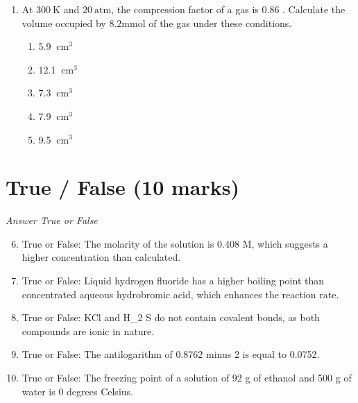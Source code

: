 \documentclass[12pt]{article}
\begin{document}
\begin{enumerate}[label=\arabic*.]
\begin{enumerate}[label=(\alph*)]
    \item IR radiation can ionize organic molecules, providing structural information
    \item absorption of IR radiation increases with molecular complexity
    \item all molecular bonds absorb IR radiation
    \item IR spectroscopy can identify isotopes within organic molecules
    \item most organic functional groups absorb in a characteristic region of the IR spectrum
\end{enumerate}
\item At $300 \mathrm{~K}$ and $20 \mathrm{~atm}$, the compression factor of a gas is 0.86 . Calculate the volume occupied by $8.2 \mathrm{mmol}$ of the gas under these conditions.
\begin{enumerate}[label=(\alph*)]
    \item 5.9 $\mathrm{~cm}^3$
    \item 12.1 $\mathrm{~cm}^3$
    \item 7.3 $\mathrm{~cm}^3$
    \item 7.9 $\mathrm{~cm}^3$
    \item 9.5 $\mathrm{~cm}^3$
\end{enumerate}
\end{enumerate}

\section*{True / False (10 marks)}
\textit{Answer True or False}
\begin{enumerate}[label=\arabic*.]
\setcounter{enumi}{5}
\item True or False: The molarity of the solution is 0.408 M, which suggests a higher concentration than calculated.
\item True or False: Liquid hydrogen fluoride has a higher boiling point than concentrated aqueous hydrobromic acid, which enhances the reaction rate.
\item True or False: KCl and H\_2 S do not contain covalent bonds, as both compounds are ionic in nature.
\item True or False: The antilogarithm of 0.8762 minus 2 is equal to 0.0752.
\item True or False: The freezing point of a solution of 92 g of ethanol and 500 g of water is 0 degrees Celsius.
\end{enumerate}
\end{document}
